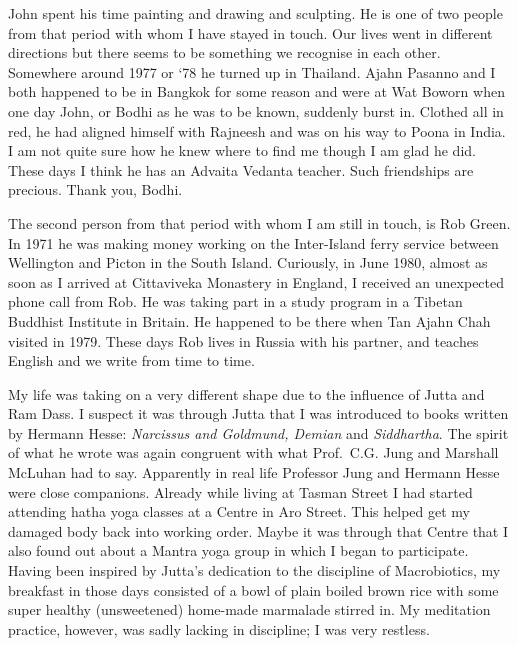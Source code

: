 John spent his time painting and drawing and sculpting. He is one of two
people from that period with whom I have stayed in touch. Our lives went
in different directions but there seems to be something we recognise in
each other. Somewhere around 1977 or `78 he turned up in Thailand. Ajahn
Pasanno and I both happened to be in Bangkok for some reason and were at
Wat Boworn when one day John, or Bodhi as he was to be known, suddenly
burst in. Clothed all in red, he had aligned himself with Rajneesh and
was on his way to Poona in India. I am not quite sure how he knew where to
find me though I am glad he did. These days I think he has an Advaita
Vedanta teacher. Such friendships are precious. Thank you, Bodhi.

The second person from that period with whom I am still in touch, is Rob
Green. In 1971 he was making money working on the Inter-Island ferry
service between Wellington and Picton in the South Island. Curiously, in
June 1980, almost as soon as I arrived at Cittaviveka Monastery in
England, I received an unexpected phone call from Rob. He was taking
part in a study program in a Tibetan Buddhist Institute in Britain. He
happened to be there when Tan Ajahn Chah visited in 1979. These days Rob
lives in Russia with his partner, and teaches English and we write from
time to time.

My life was taking on a very different shape due to the influence of
Jutta and Ram Dass. I suspect it was through Jutta that I was introduced
to books written by Hermann Hesse: \emph{Narcissus and Goldmund, Demian}
and \emph{Siddhartha}. The spirit of what he wrote was again congruent
with what Prof.~C.G. Jung and Marshall McLuhan had to say. Apparently in
real life Professor Jung and Hermann Hesse were close companions.
Already while living at Tasman Street I had started attending hatha yoga
classes at a Centre in Aro Street. This helped get my damaged body back
into working order. Maybe it was through that Centre that I also found
out about a Mantra yoga group in which I began to participate. Having
been inspired by Jutta's dedication to the discipline of Macrobiotics, my breakfast in
those days consisted of a bowl of plain boiled brown rice with some
super healthy (unsweetened) home-made marmalade stirred in. My
meditation practice, however, was sadly lacking in discipline; I was
very restless.

